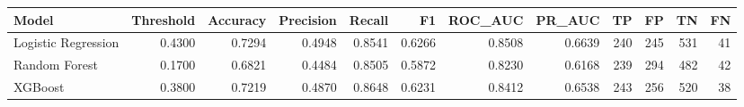 \begin{tabular}{lrrrrrrrrrrr}
\toprule
Model & Threshold & Accuracy & Precision & Recall & F1 & ROC_AUC & PR_AUC & TP & FP & TN & FN \\
\midrule
Logistic Regression & 0.4300 & 0.7294 & 0.4948 & 0.8541 & 0.6266 & 0.8508 & 0.6639 & 240 & 245 & 531 & 41 \\
Random Forest & 0.1700 & 0.6821 & 0.4484 & 0.8505 & 0.5872 & 0.8230 & 0.6168 & 239 & 294 & 482 & 42 \\
XGBoost & 0.3800 & 0.7219 & 0.4870 & 0.8648 & 0.6231 & 0.8412 & 0.6538 & 243 & 256 & 520 & 38 \\
\bottomrule
\end{tabular}
